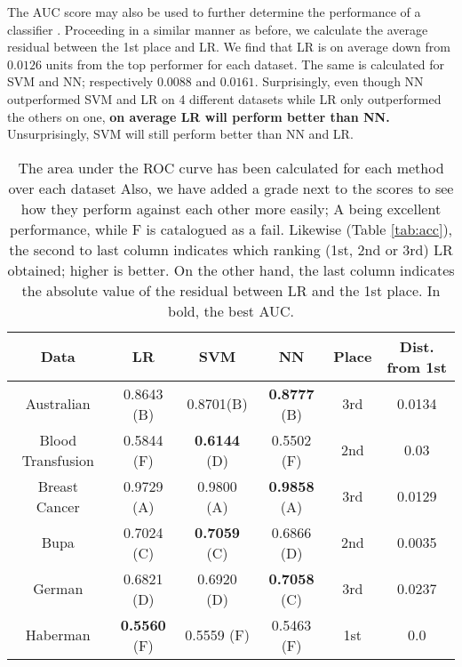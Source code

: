 \documentclass{INGUADY}
\begin{document}
\begin{body}
The AUC score may also be used to further determine the performance of a classifier \cite{fawcett}. Proceeding in a similar manner as before, we calculate the average residual between the 1st place and LR. We find that LR is on average down from $0.0126$ units from the top performer for each dataset. The same is calculated for SVM and NN; respectively $0.0088$ and $0.0161$. Surprisingly, even though NN outperformed SVM and LR on 4 different datasets while LR only outperformed the others on one, \textbf{on average LR will perform better than NN.} Unsurprisingly, SVM will still perform better than NN and LR. 

\begin{table*}
\center
\setlength{\tabcolsep}{2mm}
\caption{The area under the ROC curve has been calculated for each method over each dataset Also, we have added a grade next to the scores to see how they perform against each other more easily; A being excellent performance, while F is catalogued as a fail. Likewise (Table \ref{tab:acc}), the second to last column indicates which ranking (1st, 2nd or 3rd) LR obtained; higher is better. On the other hand, the last column indicates the absolute value of the residual between LR and the 1st place. In bold, the best AUC.} \vspace{3mm}
\begin{tabular}{c|ccc|cc}
\toprule
Data & LR & SVM & NN & Place & Dist. from 1st \\
\midrule
\midrule
Australian                  & 0.8643  (B)               & 0.8701(B)                 & \textbf{0.8777} (B)       & 3rd                   & 0.0134\\
Blood Transfusion       & 0.5844  (F)               & \textbf{0.6144} (D)       & 0.5502     (F)                    & 2nd                   & 0.03 \\
Breast Cancer               & 0.9729  (A)               & 0.9800 (A)                    & \textbf{0.9858} (A)   & 3rd                   & 0.0129 \\
Bupa                            & 0.7024  (C)               & \textbf{0.7059} (C)       & 0.6866    (D)                 & 2nd                   & 0.0035 \\
German                      & 0.6821      (D)               & 0.6920    (D)                 & \textbf{0.7058} (C)       & 3rd                   & 0.0237 \\
Haberman                    & \textbf{0.5560} (F)   & 0.5559 (F)                    & 0.5463 (F)                    & 1st                   & 0.0 \\

\end{tabular}
\end{table*}
\end{body}
\end{document}
